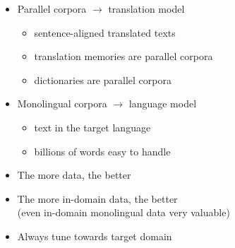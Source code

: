 \documentclass[landscape]{uedslides2C}
\begin{document}

\vspace{15mm}
\begin{itemize}
\item Parallel corpora $\rightarrow$ translation model
\begin{itemize}
\item sentence-aligned translated texts
\item translation memories are parallel corpora
\item dictionaries are parallel corpora
\end{itemize}
\item Monolingual corpora $\rightarrow$ language model
\begin{itemize}
\item text in the target language
\item billions of words easy to handle
\end{itemize}
\end{itemize}


\vspace{10mm}
\begin{itemize}
\item The more data, the better
\item The more in-domain data, the better\\
(even in-domain monolingual data very valuable)
\item Always tune towards target domain
\end{itemize}

\end{document}
